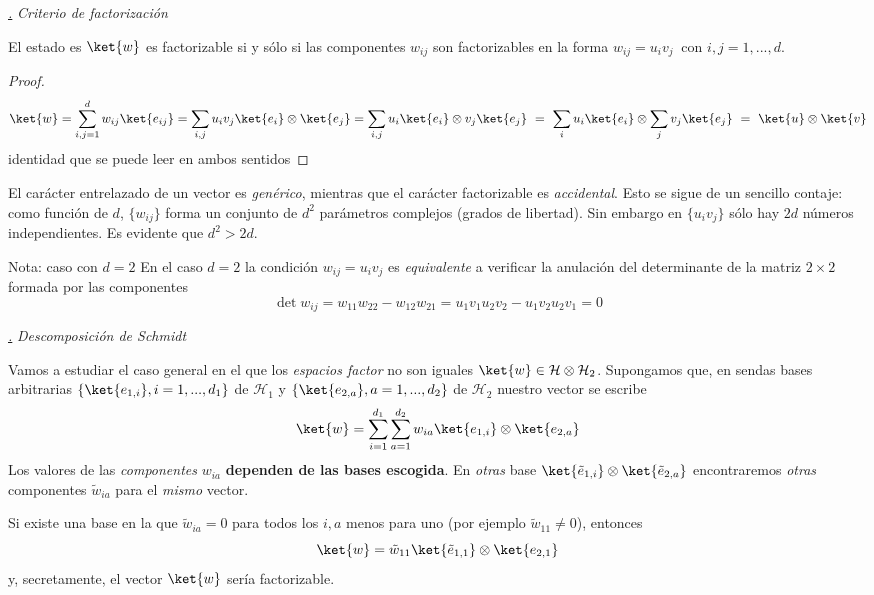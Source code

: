 \documentclass[a4paper,11pt]{book} %
\numberwithin{equation}{chapter}
\def\subsubiContadorIt{\par\addtocounter{subsubsection}{1}\underline{\it\thesubsubsection.}\hskip0.5cm \setcounter{subsubsubsectionIt}{0}}
\newcommand{\SubsubiIt}[1]{
		\subsubiContadorIt \textit{#1}
	}
\newcounter{subsubsubsectionIt}[subsubsection]
\begin{document}
			\SubsubiIt{Criterio de factorización}

\begin{mybox_gray2}{}
El estado es $\ket{w}$ es factorizable si y sólo si las componentes $w_{ij}$ son factorizables en la forma $w_{ij} = u_i v_j~$ con $i,j=1,...,d$. 
\end{mybox_gray2}
\begin{proof}
$$
\ket{w}= \sum_{i,j=1}^d w_{ij} \ket{e_{ij}}  = \sum_{i,j} u_{i}v_j \ket{e_i}\otimes \ket{e_j}= \sum_{i,j} u_{i} \ket{e_i}\otimes v_j\ket{e_j}  ~ =~ \sum_i u_i\ket{e_i} \otimes \sum_j v_j\ket{e_j} ~=~   \ket{u}\otimes \ket{v}
$$
identidad que se puede leer en ambos sentidos
\end{proof}

El carácter entrelazado de un vector es \textit{genérico}, mientras que el carácter factorizable es \textit{accidental}. Esto se sigue de un sencillo contaje: 
como función de $d$,  $\{w_{ij}\}$ forma un conjunto de $d^2$ parámetros complejos (grados de libertad). Sin embargo en $\{u_i v_j\}$ sólo hay $2d$ números independientes. Es evidente que $d^2>2d$.

	\begin{mybox_blue}{Nota: caso con ${d=2}$ }
	En el caso  $d=2$  la condición $w_{ij} = u_i v_j$ es \textit{equivalente} a verificar
    la anulación del  determinante de la matriz $2\times 2$ formada por las componentes
	$$
	\det w_{ij} =  w_{11}w_{22}- w_{12}w_{21} = u_1v_1u_2v_2-u_1v_2u_2v_1=0
	$$  
	\end{mybox_blue}




			\SubsubiIt{Descomposición de Schmidt}

Vamos a estudiar el caso general en el que los \textit{espacios factor} no son iguales $\ket{w} \in \mathcal{H} \otimes \mathcal{H}_2$. Supongamos que, en sendas bases arbitrarias $\{\ket{e_{1,i}}, i=1,...,d_1\}$  de $\mathcal{H}_1$ y  $\{\ket{e_{2,a}},a=1,...,d_2\}$  de $\mathcal{H}_2$ nuestro vector se escribe
	\begin{equation}
	\ket{w} = \sum_{i=1}^{d_1}\sum_{a=1}^{d_2} w_{ia} \ket{e_{1,i}}\otimes \ket{e_{2,a}}
	\end{equation}
Los valores de las \textit{componentes} $w_{ia}$ \textbf{dependen de las bases escogida}. En \textit{otras} base $\ket{\tilde e_{1,i}}\otimes\ket{\tilde e_{2,a}}$ encontraremos \textit{otras} componentes $\tilde w_{ia}$ para el \textit{mismo} vector. 

Si existe una base en la que $\tilde w_{ia}=0$ para todos los $i,a$ menos para uno (por ejemplo $\tilde w_{11}\neq 0$), entonces 
	\begin{equation}
	\ket{w}= \tilde w_{11}\ket{\tilde e_{1,1}}\otimes \ket{e_{2,1}}
	\end{equation}
y, secretamente, el vector $\ket{w}$ sería factorizable.
\end{document}
